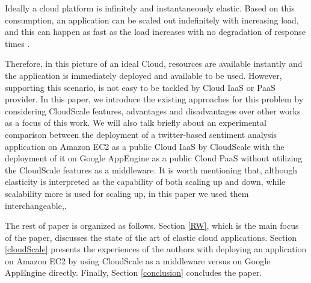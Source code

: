 \documentclass{sig-alternate}
\begin{document}
Ideally a cloud platform is infinitely and instantaneously elastic. Based on this consumption, an application can be scaled out indefinitely with increasing load, and this can happen as fast as the load increases with no degradation of response times \cite{brebner2012your}. 

Therefore, in this picture of an ideal Cloud, resources are available instantly and the application is immediately deployed and available to be used. However, supporting this scenario, is not easy to be tackled by Cloud IaaS or PaaS provider. In this paper, we introduce the existing approaches for this problem by considering CloudScale \cite{leitner2012cloudscale} features, advantages and disadvantages over other works as a focus of this work. We will also talk briefly about an experimental comparison between the deployment of a twitter-based sentiment analysis application on Amazon EC2 as a public Cloud IaaS by CloudScale with the deployment of it on Google AppEngine as a public Cloud PaaS without utilizing the CloudScale features as a middleware. It is worth mentioning that, although elasticity is interpreted as the capability of both scaling up and down, while scalability more is used for scaling up, in this paper we used them interchangeable,.

The rest of paper is organized as follows. Section \ref{RW}, which is the main focus of the paper, discusses the state of the art of elastic cloud applications. Section \ref{cloudScale} presents the experiences of the authors with deploying an application on Amazon EC2 by using CloudScale as a middleware versus on Google AppEngine directly. Finally, Section \ref{conclusion} concludes the paper.
\end{document}
